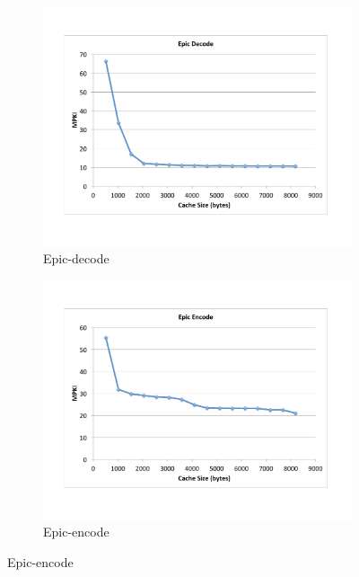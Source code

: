 \documentclass{acm_proc_article-sp}
\begin{document}
\begin{figure}
        \centering
        \begin{subfigure}[b]{0.25\textwidth}
          \includegraphics[width=\textwidth]{figs/epic-decode-miss-curve.pdf}
          \caption{Epic-decode}
          \label{fig:epic-decode}
        \end{subfigure}%
        \begin{subfigure}[b]{0.25\textwidth}
          \includegraphics[width=\textwidth]{figs/epic-encode-miss-curve.pdf}
          \caption{Epic-encode}
          \label{fig:epic-encode}
        \end{subfigure}


\end{figure}
\end{document}
